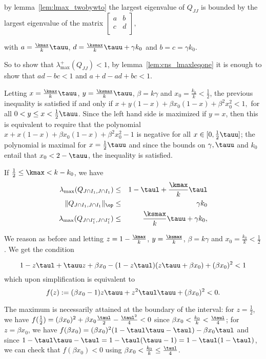 \documentclass{article}
\begin{document}
by lemma~\ref{lem:lmax_twobywto} the largest eigenvalue of $Q_{JJ}$ is bounded by the largest eigenvalue of the matrix
$\begin{bmatrix}
a & b\\
c & d \\
\end{bmatrix},
$

with $a=\frac{\kmax}{k} \tauu$, $d=\frac{\ksmax}{k}\tauu+\gamma k_0$ and $b=c=\gamma k_0$.

So to show that $\lambda_{\max}^+(Q_{JJ})<1$, by lemma~\ref{lem:cns_lmaxleqone} it is enough to show that 
$ad-bc<1$ and $a+d -ad+bc < 1$.
  
Letting $x=\frac{\kmax}{k} \tauu$, $y=\frac{\ksmax}{k}\tauu$, $\beta=k\gamma$ and $x_0=\frac{k_0}{k}<\frac{1}{2}$, the previous inequality is satisfied if and only if 
$x+y(1-x)+\beta x_0(1-x) +\beta^2 x_0^2 <1,$ for all $0<y\leq x <\frac{1}{2}\tauu$. Since the left hand side is maximized if $y=x$, then this is equivalent to require that the polynomial
$x+x(1-x)+\beta x_0(1-x) +\beta^2 x_0^2 -1$ is negative for all $x \in [0,\frac{1}{2}\tauu]$; the polynomial is maximal for $x=\frac{1}{2}\tauu$ and since the bounds on $\gamma, \tauu$ and $k_0$ entail that $x_0<2-\tauu$, the inequality is satisfied.

\item If $\frac{1}{2} \leq \kmax < k-k_0$, we have
\begin{eqnarray*}
\lambda_{\max}(Q_{J \cap I_1,J \cap I_1}) & \leq & 1-\taul +\frac{\kmax}{k} \taul\\
\|Q_{J \cap I_1,J \cap I_1}\|_{\op} & \leq & \gamma k_0 \\
\lambda_{\max}(Q_{J \cap I_1^c,J \cap I_1^c})  & \leq & \frac{\ksmax}{k}\tauu+\gamma k_0, 
\end{eqnarray*}

We reason as before and letting $z=1-\frac{\kmax}{k}$, $y=\frac{\ksmax}{k}$, $\beta=k\gamma$ and $x_0=\frac{k_0}{k}<\frac{1}{2}$.
We get the condition

$$1-z \taul+\tauu z+\beta x_0-(1-z \taul) (z\tauu+\beta x_0)+(\beta x_0)^2<1$$ which upon simplification is equivalent to $$f(z):=(\beta x_0-1)z \tauu + z^2 \taul\tauu+(\beta x_0)^2<0.$$ 

The maximum is necessarily attained at the boundary of the interval: for $z=\frac{1}{2}$, 
we have $f(\frac{1}{2})=(\beta x_0)^2+\beta x_0 \frac{\taul}{2}-\frac{\taul^2}{4}<0$ since 
$\beta x_0<\frac{k_0}{k}<\frac{\taul}{4}$; for  $z=\beta x_0$, we have $f(\beta x_0)=(\beta x_0)^2 (1-\taul\tauu-\taul)-\beta x_0 \taul$ and since $1-\taul\tauu-\taul=1-\taul(\tauu-1)=1-\taul(1-\taul)$, 
we can check that $f(\beta x_0)<0$ using $\beta x_0< \frac{k_0}{k} \leq \frac{\taul}{4}$.
\end{document}
